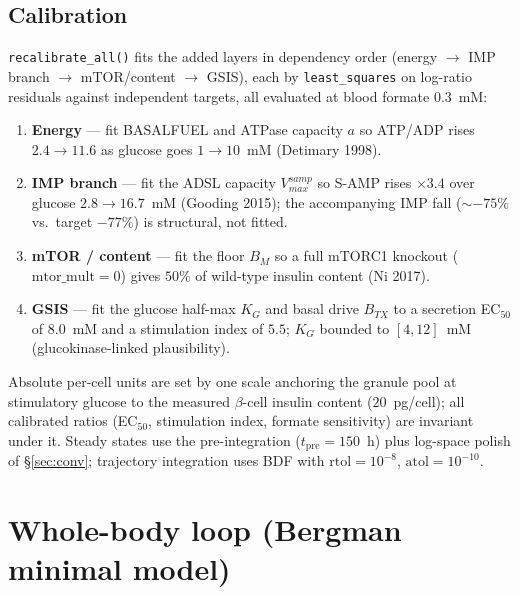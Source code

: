 \documentclass[11pt]{article}
\begin{document}
\subsection{Calibration}\label{sec:betacal}
\texttt{recalibrate\_all()} fits the added layers in dependency order (energy
$\to$ IMP branch $\to$ mTOR/\allowbreak content $\to$ GSIS), each by \texttt{least\_squares} on
log-ratio residuals against independent targets, all evaluated at blood formate
$0.3$~mM:
\begin{enumerate}\itemsep1pt
\item \textbf{Energy} — fit BASALFUEL and ATPase capacity $a$ so ATP/ADP rises
$2.4\to11.6$ as glucose goes $1\to10$~mM (Detimary 1998).
\item \textbf{IMP branch} — fit the ADSL capacity $V_{max}^{samp}$ so S-AMP rises
$\times3.4$ over glucose $2.8\to16.7$~mM (Gooding 2015); the accompanying IMP fall
($\sim{-}75\%$ vs.\ target $-77\%$) is structural, not fitted.
\item \textbf{mTOR / content} — fit the floor $B_M$ so a full mTORC1 knockout
($\mathrm{mtor\_mult}{=}0$) gives $50\%$ of wild-type insulin content (Ni 2017).
\item \textbf{GSIS} — fit the glucose half-max $K_G$ and basal drive $B_{TX}$ to a
secretion EC$_{50}$ of $8.0$~mM and a stimulation index of $5.5$; $K_G$ bounded to
$[4,12]$~mM (glucokinase-linked plausibility).
\end{enumerate}
Absolute per-cell units are set by one scale anchoring the granule pool at
stimulatory glucose to the measured $\beta$-cell insulin content ($20$~pg/cell);
all calibrated ratios (EC$_{50}$, stimulation index, formate sensitivity) are
invariant under it. Steady states use the pre-integration ($t_{\mathrm{pre}}=150$~h)
plus log-space polish of \S\ref{sec:conv}; trajectory integration uses BDF with
$\mathrm{rtol}=10^{-8}$, $\mathrm{atol}=10^{-10}$.

\section{Whole-body loop (Bergman minimal model)}\label{sec:wb}
\end{document}
